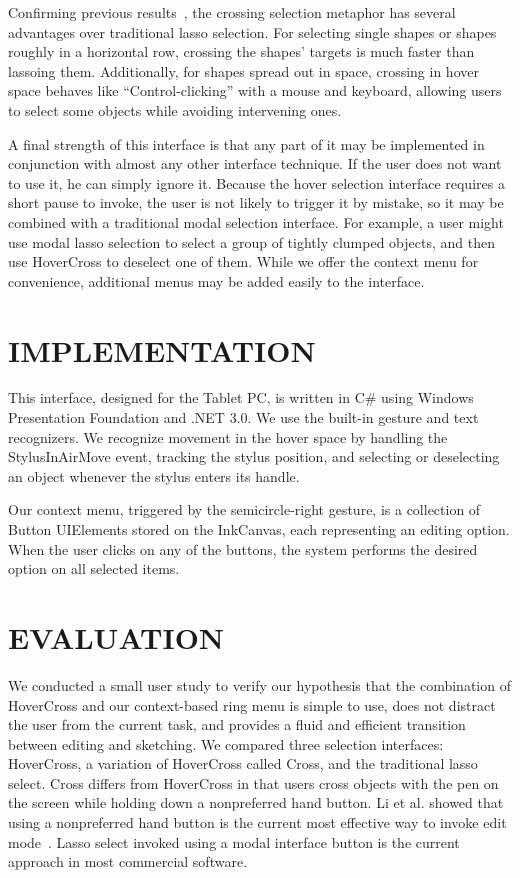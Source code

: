 \documentclass{article}
\begin{document}
Confirming previous results~\cite{Apitz2004Crossy}, the crossing
selection metaphor has several advantages over traditional lasso
selection.  For selecting single shapes or shapes roughly in a
horizontal row, crossing the shapes' targets is much faster than
lassoing them.  Additionally, for shapes spread out in space, crossing
in hover space behaves like ``Control-clicking'' with a mouse and
keyboard, allowing users to select some objects while avoiding
intervening ones.

A final strength of this interface is that any part of it may be
implemented in conjunction with almost any other interface technique.
If the user does not want to use it, he can simply ignore it.  Because
the hover selection interface requires a short pause to invoke, the
user is not likely to trigger it by mistake, so it may be combined
with a traditional modal selection interface.  For example, a user
might use modal lasso selection to select a group of tightly clumped
objects, and then use HoverCross to deselect one of them.  While we
offer the context menu for convenience, additional menus may be added
easily to the interface.

\section{IMPLEMENTATION}

This interface, designed for the Tablet PC, is written in C\# using
Windows Presentation Foundation and .NET 3.0. We use the built-in
gesture and text recognizers.  We recognize movement in the hover
space by handling the StylusInAirMove event, tracking the stylus
position, and selecting or deselecting an object whenever the stylus
enters its handle.

Our context menu, triggered by the semicircle-right gesture, is a
collection of Button UIElements stored on the InkCanvas, each
representing an editing option. When the user clicks on any of the
buttons, the system performs the desired option on all selected items.

\section{EVALUATION}
We conducted a small user study to verify our hypothesis that the
combination of HoverCross and our context-based ring menu is simple to
use, does not distract the user from the current task, and provides a
fluid and efficient transition between editing and sketching.  We
compared three selection interfaces: HoverCross, a variation of
HoverCross called Cross, and the traditional lasso select. Cross
differs from HoverCross in that users cross objects with the pen on
the screen while holding down a nonpreferred hand button.  Li et
al. showed that using a nonpreferred hand button is the current most
effective way to invoke edit mode~\cite{Li2005Experimental}. Lasso
select invoked using a modal interface button is the current approach
in most commercial software.
\end{document}
